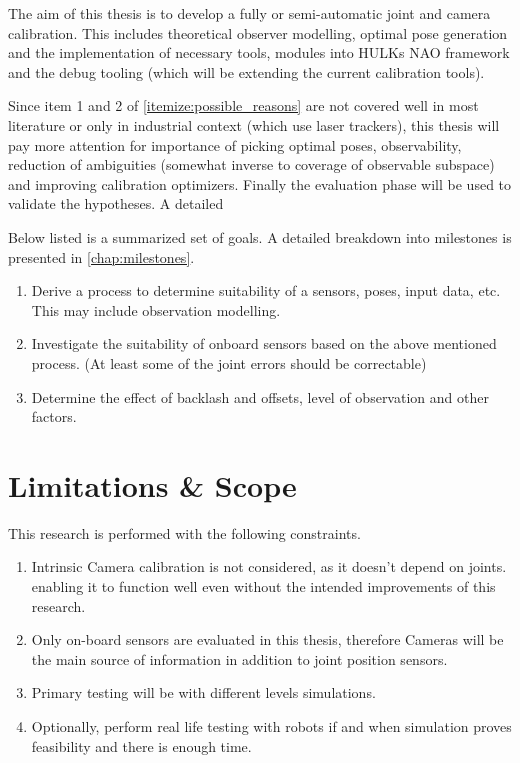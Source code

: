 \documentclass[english, printversion, nomenclature, notitle]{tuvisionthesis} %
\makeatletter
\renewcommand{\todo}[2][]{\tikzexternaldisable\@todo[#1]{#2}\tikzexternalenable}
\makeatother
\begin{document}
The aim of this thesis is to develop a fully or semi-automatic joint and camera calibration. This includes theoretical observer modelling, optimal  pose generation and the implementation of necessary tools, modules into HULKs NAO framework and the debug tooling (which will be extending the current calibration tools).

Since item 1 and 2 of \cref{itemize:possible_reasons} are not covered well in most literature or only in industrial context (which use laser trackers), this thesis will pay more attention for importance of picking optimal poses, observability, reduction of ambiguities (somewhat inverse to coverage of observable subspace) \todo{use a section to define wording} and improving calibration optimizers. Finally the evaluation phase will be used to validate the hypotheses. A detailed 

Below listed is a summarized set of goals. A detailed breakdown into milestones is presented in \cref{chap:milestones}.

\begin{enumerate}
	\item Derive a process to determine suitability of a sensors, poses, input data, etc. This may include observation modelling.
	\item Investigate the suitability of onboard sensors based on the above mentioned process. (At least some of the joint errors should be correctable)
	\item Determine the effect of backlash and offsets, level of observation and other factors.
\end{enumerate}

\section{Limitations \& Scope}

This research is performed with the following constraints.

\begin{enumerate}
	\item Intrinsic Camera calibration is not considered, as it doesn't depend on joints. enabling it to function well even without the intended improvements of this research.
	\item Only on-board sensors are evaluated in this thesis, therefore Cameras will be the main source of information in addition to joint position sensors.
	\item Primary testing will be with different levels simulations.
	\item Optionally, perform real life testing with robots if and when simulation proves feasibility and there is enough time.
\end{enumerate}
\end{document}
